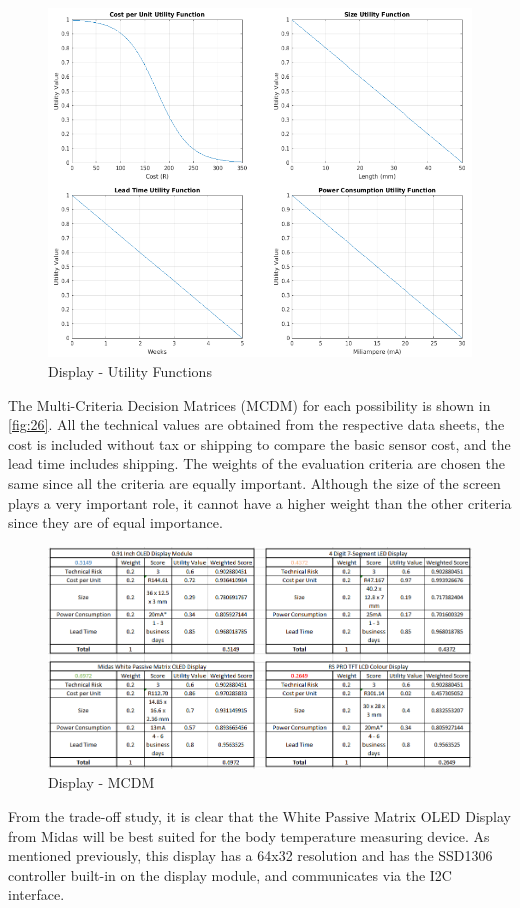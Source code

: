 \begin{figure}[H]
	\centering
	\includegraphics[scale=0.5]{img/D-Util}
	\caption{Display - Utility Functions}
	\label{fig:25}
\end{figure}
\noindent
The Multi-Criteria Decision Matrices (MCDM) for each possibility is shown in \autoref{fig:26}. All the technical values are obtained from the respective data sheets, the cost is included without tax or shipping to compare the basic sensor cost, and the lead time includes shipping. The weights of the evaluation criteria are chosen the same since all the criteria are equally important. Although the size of the screen plays a very important role, it cannot have a higher weight than the other criteria since they are of equal importance.
\begin{figure}[H]
	\centering
	\includegraphics[scale=0.55]{img/D-MCDM}
	\caption{Display - MCDM}
	\label{fig:26}
\end{figure}
\noindent
From the trade-off study, it is clear that the White Passive Matrix OLED Display from Midas will be best suited for the body temperature measuring device. As mentioned previously, this display has a 64x32 resolution and has the SSD1306 controller built-in on the display module, and communicates via the I2C interface. 


